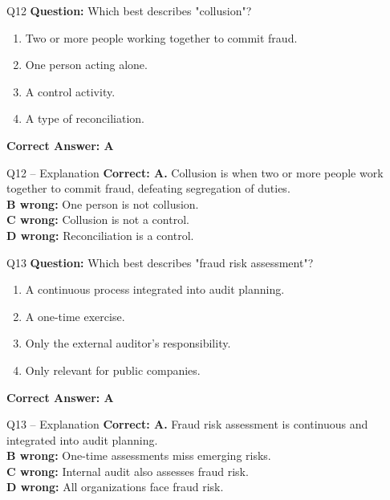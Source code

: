 \documentclass[aspectratio=169,10pt]{beamer}
\begin{document}
	\begin{frame}[t]{Q12}
		\small
		\textbf{Question:} Which best describes "collusion"?
		\begin{enumerate}[label=\Alph*.,itemsep=1pt,topsep=2pt]
			\item Two or more people working together to commit fraud.
			\item One person acting alone.
			\item A control activity.
			\item A type of reconciliation.
		\end{enumerate}
		\vspace{4pt}
		\textbf{Correct Answer: A}
	\end{frame}
	
	\begin{frame}[t]{Q12 -- Explanation}
		\small
		\textbf{Correct: A.} Collusion is when two or more people work together to commit fraud, defeating segregation of duties. \\[4pt]
		\textbf{B wrong:} One person is not collusion. \\[2pt]
		\textbf{C wrong:} Collusion is not a control. \\[2pt]
		\textbf{D wrong:} Reconciliation is a control.
	\end{frame}
	
	\begin{frame}[t]{Q13}
		\small
		\textbf{Question:} Which best describes "fraud risk assessment"?
		\begin{enumerate}[label=\Alph*.,itemsep=1pt,topsep=2pt]
			\item A continuous process integrated into audit planning.
			\item A one-time exercise.
			\item Only the external auditor's responsibility.
			\item Only relevant for public companies.
		\end{enumerate}
		\vspace{4pt}
		\textbf{Correct Answer: A}
	\end{frame}
	
	\begin{frame}[t]{Q13 -- Explanation}
		\small
		\textbf{Correct: A.} Fraud risk assessment is continuous and integrated into audit planning. \\[4pt]
		\textbf{B wrong:} One-time assessments miss emerging risks. \\[2pt]
		\textbf{C wrong:} Internal audit also assesses fraud risk. \\[2pt]
		\textbf{D wrong:} All organizations face fraud risk.
	\end{frame}
	
\end{document}
